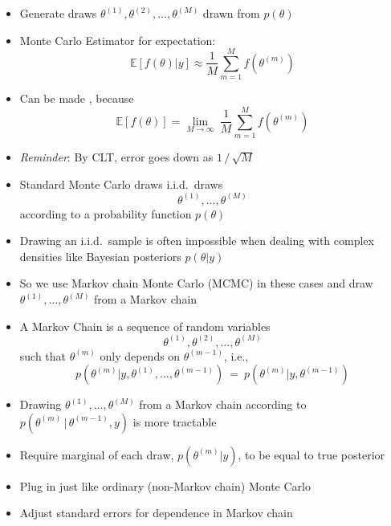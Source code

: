 \documentclass[10pt]{report}
\begin{document}
\begin{itemize}
\item Generate draws $\theta^{(1)}, \theta^{(2)}, \ldots,
  \theta^{(M)}$ drawn from $p(\theta)$
\item Monte Carlo Estimator  for expectation:
  \[
  \mathbb{E}[f(\theta)|y] \approx \frac{1}{M} \sum_{m=1}^M f(\theta^{(m)})
  \]
\item Can be made , because
\[
\mathbb{E}[f(\theta)] 
= 
\lim_{M \rightarrow \infty} \
\frac{1}{M} \sum_{m=1}^M f(\theta^{(m)})
\]
\vfill
\item {\slshape Reminder}:  By CLT, error goes down as
$1 \, / \, \sqrt{M}$
\end{itemize}




%
\begin{itemize}
\item Standard Monte Carlo draws i.i.d.\ draws
\[
\theta^{(1)}, \ldots, \theta^{(M)}
\]
according to a probability function $p(\theta)$
\item Drawing an i.i.d.\ sample is often impossible when
  dealing with complex densities like Bayesian posteriors $p(\theta|y)$
\item So we use Markov chain Monte Carlo (MCMC) in these cases and
  draw $\theta^{(1)}, \ldots, \theta^{(M)}$ from a Markov chain
\end{itemize}

\begin{itemize}
\item A Markov Chain is a sequence of random variables 
\[
\theta^{(1)},
  \theta^{(2)}, \ldots, \theta^{(M)}
\]
such that $\theta^{(m)}$ only depends on $\theta^{(m-1)}$, i.e.,
\[
p(\theta^{(m)} | y, \theta^{(1)}, \ldots, \theta^{(m-1)})
\ = \
p(\theta^{(m)} | y, \theta^{(m-1)})
\]
\item Drawing $\theta^{(1)}, \ldots, \theta^{(M)}$ from a Markov chain
  according to \\ $p(\theta^{(m)} \, | \, \theta^{(m-1)}, y)$ is more tractable
\item Require marginal of each draw, $p(\theta^{(m)}|y)$,
  to be equal to true posterior
\end{itemize}

\begin{itemize}
\item Plug in just like ordinary (non-Markov chain) Monte Carlo
\item Adjust standard errors for dependence in Markov chain
\end{itemize}
\end{document}
